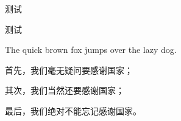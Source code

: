 \documentclass[
    bachelor, 
    pdflinks,
    ]{xjtuthesis}
\begin{document}

                    测试


                        测试



                The quick brown fox jumps over the lazy dog.

    \xjtuendappendix


        

        首先，我们毫无疑问要感谢国家；

        其次，我们当然还要感谢国家；

        最后，我们绝对不能忘记感谢国家。
\end{document}
